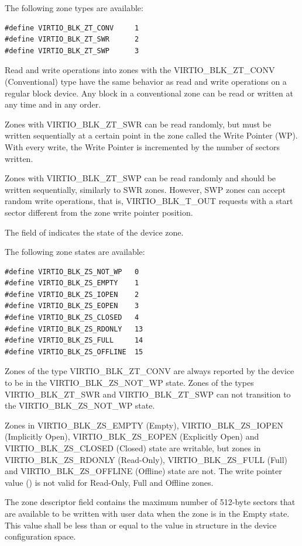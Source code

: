 The following zone types are available:

\begin{lstlisting}
#define VIRTIO_BLK_ZT_CONV     1
#define VIRTIO_BLK_ZT_SWR      2
#define VIRTIO_BLK_ZT_SWP      3
\end{lstlisting}

Read and write operations into zones with the VIRTIO_BLK_ZT_CONV (Conventional)
type have the same behavior as read and write operations on a regular block
device. Any block in a conventional zone can be read or written at any time and
in any order.

Zones with VIRTIO_BLK_ZT_SWR can be read randomly, but must be written
sequentially at a certain point in the zone called the Write Pointer (WP). With
every write, the Write Pointer is incremented by the number of sectors written.

Zones with VIRTIO_BLK_ZT_SWP can be read randomly and should be written
sequentially, similarly to SWR zones. However, SWP zones can accept random write
operations, that is, VIRTIO_BLK_T_OUT requests with a start sector different
from the zone write pointer position.

The field  of  indicates the
state of the device zone.

The following zone states are available:

\begin{lstlisting}
#define VIRTIO_BLK_ZS_NOT_WP   0
#define VIRTIO_BLK_ZS_EMPTY    1
#define VIRTIO_BLK_ZS_IOPEN    2
#define VIRTIO_BLK_ZS_EOPEN    3
#define VIRTIO_BLK_ZS_CLOSED   4
#define VIRTIO_BLK_ZS_RDONLY   13
#define VIRTIO_BLK_ZS_FULL     14
#define VIRTIO_BLK_ZS_OFFLINE  15
\end{lstlisting}

Zones of the type VIRTIO_BLK_ZT_CONV are always reported by the device to be in
the VIRTIO_BLK_ZS_NOT_WP state. Zones of the types VIRTIO_BLK_ZT_SWR and
VIRTIO_BLK_ZT_SWP can not transition to the VIRTIO_BLK_ZS_NOT_WP state.

Zones in VIRTIO_BLK_ZS_EMPTY (Empty), VIRTIO_BLK_ZS_IOPEN (Implicitly Open),
VIRTIO_BLK_ZS_EOPEN (Explicitly Open) and VIRTIO_BLK_ZS_CLOSED (Closed) state
are writable, but zones in VIRTIO_BLK_ZS_RDONLY (Read-Only), VIRTIO_BLK_ZS_FULL
(Full) and VIRTIO_BLK_ZS_OFFLINE (Offline) state are not. The write pointer
value () is not valid for Read-Only, Full and Offline zones.

The zone descriptor field  contains the maximum number of 512-byte
sectors that are available to be written with user data when the zone is in the
Empty state. This value shall be less than or equal to the 
value in  structure in the device
configuration space.

